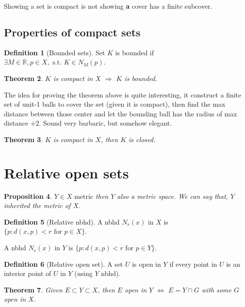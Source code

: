 \documentclass[12pt]{article}
\newcommand{\RR}{\mathbb{R}}   %
\theoremstyle{definition}
\newtheorem{definition}{Definition}[section]
\theoremstyle{plain}
\newtheorem{theorem}[definition]{Theorem}
\newtheorem{proposition}[definition]{Proposition}
\begin{document}
\begin{note}
Showing a set is compact is not showing \textbf{a} cover has a finite subcover.
\end{note}

\subsection{Properties of compact sets}
\begin{definition}[Bounded sets]
Set $K$ is bounded if $\exists M\in\RR, p \in X, \text{ s.t. } K\in N_M(p)$.
\end{definition}

\begin{theorem}
$K$ is compact in $X$ $\Rightarrow$ $K$ is bounded.
\end{theorem}

\begin{note}
The idea for proving the theorem above is quite interesting, it construct a finite set of unit-1 balls to cover the set (given it is compact), then find the max distance between those center and let the bounding ball has the radius of max distance $+2$. Sound very barbaric, but somehow elegant.
\end{note}

\begin{theorem}
$K$ is compact in $X$, then $K$ is closed.
\end{theorem}

\section{Relative open sets}
\begin{proposition}
$Y \in X \text{ metric}$ then $Y$ also a metric space. We can say that, $Y$ inherited the metric of $X$. 
\end{proposition}

\begin{definition}[Relative nbhd]
A nbhd $N_r(x)$ in $X$ is $\{p:d(x,p)<r \text{ for } p \in X\}$.

A nbhd $N_r(x)$ in $Y$ is $\{p:d(x,p)<r \text{ for } p \in Y\}$.
\end{definition}

\begin{definition}[Relative open set]
A set $U$ is open in $Y$ if every point in $U$ is an interior point of $U$ in $Y$ (using $Y$ nbhd).
\end{definition}

\begin{theorem}
Given $E\subset Y \subset X$, then $E$ open in $Y$ $\iff$ $E = Y \cap G$ with some $G$ open in $X$.
\end{theorem}
\end{document}

